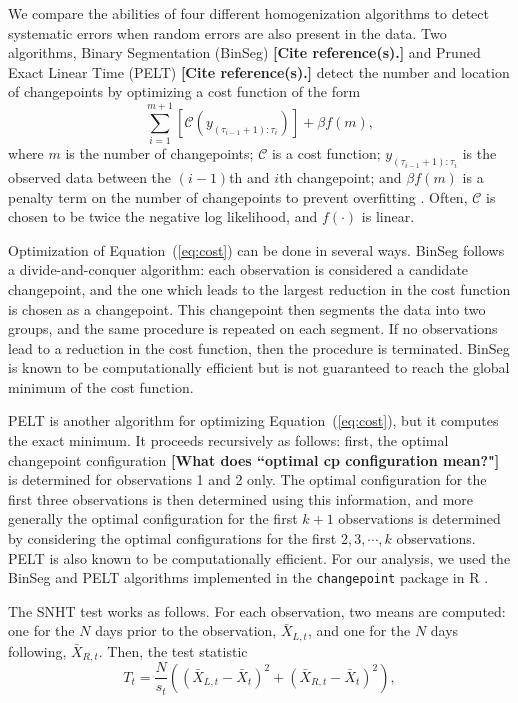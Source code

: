 \documentclass[12pt]{article}
\begin{document}
\begin{doublespacing}
We compare the abilities of four different homogenization algorithms  to detect systematic errors when random errors are also present in the data.  Two algorithms, Binary Segmentation (BinSeg) \textbf{[Cite reference(s).]} and Pruned Exact Linear Time (PELT) \textbf{[Cite reference(s).]} detect the number and location of changepoints by optimizing a cost function of the form
\begin{equation}
	\sum_{i=1}^{m+1} [\mathcal{C}(y_{(\tau_{i-1}+1):\tau_i})] + \beta f(m),
	\label{eq:cost}
\end{equation}
where $m$ is the number of changepoints; $\mathcal{C}$ is a cost function; $y_{(\tau_{i-1}+1):\tau_i}$ is the observed data between the $(i-1)$th and $i$th changepoint; and $\beta f(m)$ is a penalty term on the number of changepoints to prevent overfitting \cite{killick12}.  Often, $\mathcal{C}$ is chosen to be twice the negative log likelihood, and $f(\cdot)$ is  linear.

Optimization of Equation~(\ref{eq:cost}) can be done in several ways.  BinSeg follows a divide-and-conquer algorithm: each observation is considered a candidate changepoint, and the one which leads to the largest reduction in the cost function is chosen as a changepoint.  This changepoint then segments the data into two groups, and the same procedure is repeated on each segment.  If no observations lead to a reduction in the cost function, then the procedure is terminated.  BinSeg is known to be computationally efficient but is not guaranteed to reach the global minimum of the cost function.

PELT is another algorithm for optimizing Equation~(\ref{eq:cost}), but it computes the exact minimum.  It proceeds recursively as follows: first, the optimal changepoint configuration \textbf{[What does ``optimal cp configuration mean?"]} is determined for observations 1 and 2 only.  The optimal configuration for the first three observations is then determined using this information, and more generally the optimal configuration for the first $k+1$ observations is determined by considering the optimal configurations for the first $2, 3, \cdots, k$ observations.  PELT is also known to be computationally efficient.  For our analysis, we used the BinSeg and PELT algorithms implemented in the \texttt{changepoint} package in R \cite{killick14}.

The SNHT test works as follows.  For each observation, two means are computed: one for the $N$ days prior to the observation, $\bar{X}_{L,t}$, and one for the $N$ days following, $\bar{X}_{R,t}$.  Then, the test statistic
\begin{equation}
	T_t = \frac{N}{s_t}\left( (\bar{X}_{L,t}-\bar{X}_t)^2 + (\bar{X}_{R,t}-\bar{X}_t)^2\right),
	\label{eq:Hom}
\end{equation}











\end{doublespacing}
\end{document}
